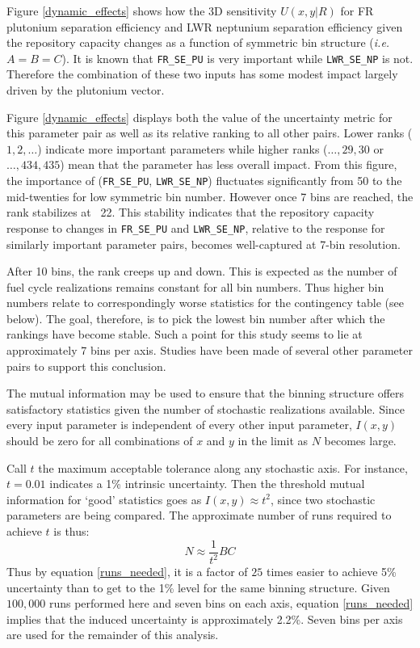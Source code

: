 \documentclass[a4paper, 12pt]{article}
\begin{document}
Figure \ref{dynamic_effects} shows how the 3D sensitivity $U(x,y|R)$ for FR plutonium separation efficiency and LWR neptunium separation efficiency given the repository
capacity changes as a function of symmetric bin structure (\emph{i.e.} $A=B=C$).  It is known that \texttt{FR\_SE\_PU} is very important
while \texttt{LWR\_SE\_NP} is not.  Therefore the combination of these two inputs has some modest impact largely driven by the plutonium vector.

Figure \ref{dynamic_effects} displays both the value of the uncertainty metric for this parameter pair as well as its relative ranking to all other pairs.
Lower ranks ($1, 2, \ldots$) indicate more important parameters while higher ranks ($\ldots, 29, 30$ or $\ldots, 434, 435$) mean that the parameter has less overall
impact.  From this figure, the importance of (\texttt{FR\_SE\_PU}, \texttt{LWR\_SE\_NP}) fluctuates significantly from 50 to the mid-twenties for low symmetric
bin number.  However once 7 bins are reached, the rank stabilizes at ~22.  This stability indicates that the repository capacity response to changes in \texttt{FR\_SE\_PU} and \texttt{LWR\_SE\_NP}, relative to the response for similarly important parameter pairs, becomes well-captured at 7-bin resolution.

After 10 bins, the rank creeps up and down.  This is expected as the number of
fuel cycle realizations remains constant for all bin numbers.  Thus higher bin numbers relate to correspondingly worse statistics for the contingency table (see below).  The goal, therefore, is to pick the lowest bin number after which the rankings have become stable.  Such a point for this study seems to lie at approximately
7 bins per axis.  Studies have been made of several other parameter pairs to support this conclusion.

The mutual information may be used to ensure that the binning structure offers satisfactory statistics given the number of stochastic realizations available.  Since every input parameter is independent of every other input parameter, $I(x,y)$ should be zero for all combinations of $x$ and $y$
in the limit as $N$ becomes large.

Call $t$ the maximum acceptable tolerance along any stochastic axis.
For instance, $t = 0.01$ indicates a 1\% intrinsic uncertainty.
Then the threshold mutual information for `good' statistics goes as $I(x,y) \approx t^2$, since
two stochastic parameters are being compared.  The approximate number of runs required to achieve $t$ is thus:
\begin{equation}
N \approx \frac{1}{t^2} B C
\label{runs_needed}
\end{equation}
Thus by equation \ref{runs_needed}, it is a factor of $25$ times easier to achieve 5\% uncertainty than to get to the 1\% level for the same binning structure.
Given $100,000$ runs performed here and seven bins on each axis, equation \ref{runs_needed} implies
that the induced uncertainty is approximately 2.2\%.  Seven bins per axis are used for the remainder of this analysis.
\end{document}
